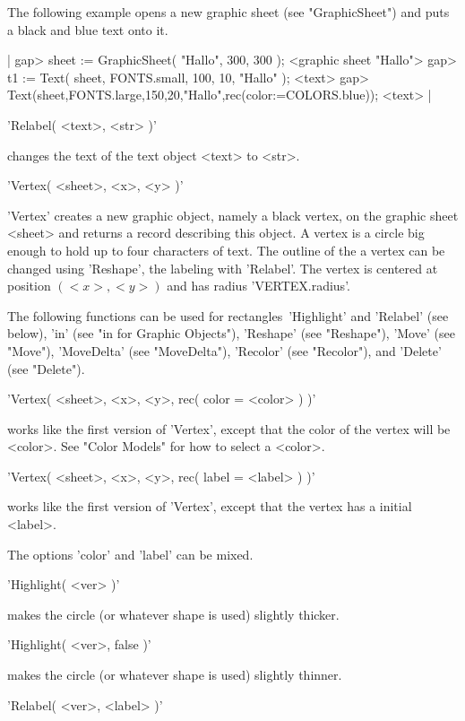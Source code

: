 The following example opens a new  graphic sheet (see "GraphicSheet") and
puts a black and blue text onto it.

|    gap> sheet := GraphicSheet( "Hallo", 300, 300 );
    <graphic sheet "Hallo">
    gap> t1 := Text( sheet, FONTS.small, 100, 10, "Hallo" );
    <text>
    gap> Text(sheet,FONTS.large,150,20,"Hallo",rec(color:=COLORS.blue));
    <text> |

'Relabel( <text>, <str> )'

changes the text of the text object <text> to <str>.


'Vertex( <sheet>, <x>, <y> )'

'Vertex' creates a  new graphic  object, namely a  black  vertex, on  the
graphic    sheet <sheet> and  returns a    {\GAP} record describing  this
object. A vertex is a circle big enough to  hold up to four characters of
text.  The outline of  the a vertex can  be changed using  'Reshape', the
labeling with 'Relabel'.  The vertex  is centered at position $(<x>,<y>)$
and has radius 'VERTEX.radius'.

The following   functions can be used  for  rectangles\:\ 'Highlight' and
'Relabel'  (see  below), 'in'  (see  "in for Graphic Objects"), 'Reshape'
(see  "Reshape"), 'Move'  (see  "Move"),  'MoveDelta'  (see "MoveDelta"),
'Recolor' (see "Recolor"), and 'Delete' (see "Delete").

'Vertex( <sheet>, <x>, <y>, rec( color \:= <color> ) )'

works like the first  version of 'Vertex',  except that the color of  the
vertex will be <color>.  See "Color Models" for how to select a <color>.

'Vertex( <sheet>, <x>, <y>, rec( label \:= <label> ) )'

works like the first  version of 'Vertex',  except that the vertex has a
initial <label>.

The options 'color' and 'label' can be mixed.

'Highlight( <ver> )'

makes the circle (or whatever shape is used) slightly thicker.

'Highlight( <ver>, false )'

makes the circle (or whatever shape is used) slightly thinner.

'Relabel( <ver>, <label> )'

